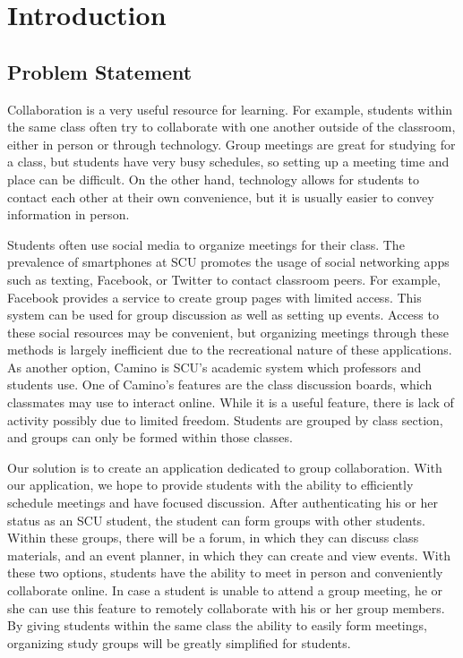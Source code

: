 \chapter{Introduction}
\section{Problem Statement}

Collaboration is a very useful resource for learning. For example, students within the same class often try to collaborate with one another outside of the classroom, either in person or through technology. Group meetings are great for studying for a class, but students have very busy schedules, so setting up a meeting time and place can be difficult. On the other hand, technology allows for students to contact each other at their own convenience, but it is usually easier to convey information in person. 

Students often use social media to organize meetings for their class. The prevalence of smartphones at SCU promotes the usage of social networking apps such as texting, Facebook, or Twitter to contact classroom peers. For example, Facebook provides a service to create group pages with limited access. This system can be used for group discussion as well as setting up events. Access to these social resources may be convenient, but organizing meetings through these methods is largely inefficient due to the recreational nature of these applications. As another option, Camino is SCU's academic system which professors and students use. One of Camino's features are the class discussion boards, which classmates may use to interact online. While it is a useful feature, there is lack of activity possibly due to limited freedom. Students are grouped by class section, and groups can only be formed within those classes.

Our solution is to create an application dedicated to group collaboration.  With our application, we hope to provide students with the ability to efficiently schedule meetings and have focused discussion. After authenticating his or her status as an SCU student, the student can form groups with other students. Within these groups, there will be a forum, in which they can discuss class materials, and an event planner, in which they can create and view events. With these two options, students have the ability to meet in person and conveniently collaborate online. In case a student is unable to attend a group meeting, he or she can use this feature to remotely collaborate with his or her group members. By giving students within the same class the ability to easily form meetings,  organizing study groups will be greatly simplified for students.


